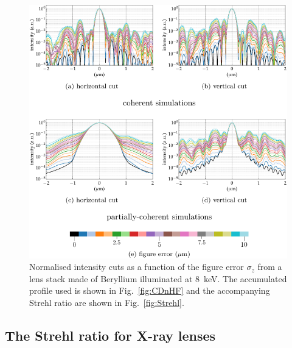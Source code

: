 \begin{refsection}
\begin{figure}[h]
    \centering
    \includegraphics[width=0.7\linewidth]{figures/ch05/hf_strehl_scan.pdf} %
    \caption[Normalised intensity cut for $\sigma_z$ scan]{Normalised intensity cuts as a function of the figure error $\sigma_z$ from a lens stack made of Beryllium illuminated at 8~keV. The accumulated profile used is shown in Fig.~\ref{fig:CDnHF} and the accompanying Strehl ratio are shown in Fig.~\ref{fig:Strehl}.}
    \label{fig:hf_strehl_scan}
\end{figure}{}

\subsection{The Strehl ratio for X-ray lenses}\label{section:discussion_strehl}


\end{refsection}

